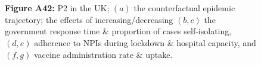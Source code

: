 \documentclass[paper=a4,fontsize=11pt]{article}
\begin{document}
\begin{figure}[!h]
  \\
  \hspace{1.76cm}
  \\
  \caption*{\textbf{Figure A42:} P2 in the UK; $(a)$ the counterfactual epidemic trajectory; the effects of increasing/decreasing $(b,c)$ the government response time \& proportion of cases self-isolating, $(d,e)$ adherence to NPIs during lockdown \& hospital capacity, and $(f,g)$ vaccine administration rate \& uptake.}
\end{figure}
\end{document}
